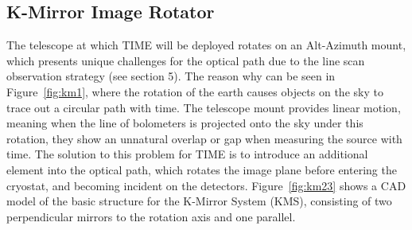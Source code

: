 \documentclass[manuscript]{aastex}
\begin{document}


\subsection{\textbf{K-Mirror Image Rotator}}
The telescope at which TIME will be deployed rotates on an Alt-Azimuth mount, which presents unique challenges for the optical path due to the line scan observation strategy (see section 5). The reason why can be seen in Figure~\ref{fig:km1}, where the rotation of the earth causes objects on the sky to trace out a circular path with time. The telescope mount provides linear motion, meaning when the line of bolometers is projected onto the sky under this rotation, they show an unnatural overlap or gap when measuring the source with time. The solution to this problem for TIME is to introduce an additional element into the optical path, which rotates the image plane before entering the cryostat, and becoming incident on the detectors. Figure~\ref{fig:km23} shows a CAD model of the basic structure for the K-Mirror System (KMS), consisting of two perpendicular mirrors to the rotation axis and one parallel.
\end{document}
